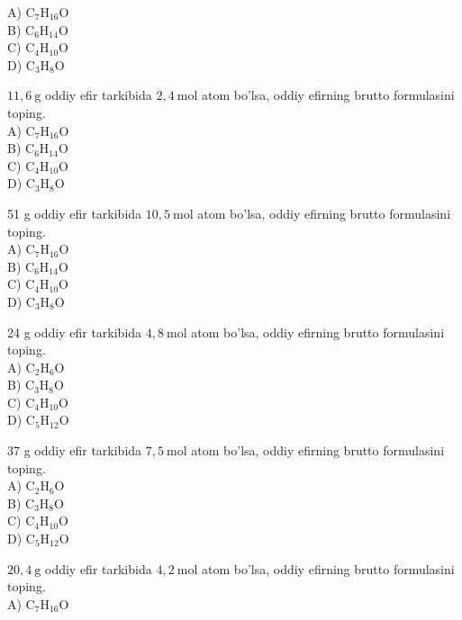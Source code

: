 A) $\mathrm{C}_{7} \mathrm{H}_{16} \mathrm{O}$\\
B) $\mathrm{C}_{6} \mathrm{H}_{14} \mathrm{O}$\\
C) $\mathrm{C}_{4} \mathrm{H}_{10} \mathrm{O}$\\
D) $\mathrm{C}_{3} \mathrm{H}_{8} \mathrm{O}$
  \item $11,6 \mathrm{~g}$ oddiy efir tarkibida $2,4 \mathrm{~mol}$ atom bo'lsa, oddiy efirning brutto formulasini toping.\\
A) $\mathrm{C}_{7} \mathrm{H}_{16} \mathrm{O}$\\
B) $\mathrm{C}_{6} \mathrm{H}_{14} \mathrm{O}$\\
C) $\mathrm{C}_{4} \mathrm{H}_{10} \mathrm{O}$\\
D) $\mathrm{C}_{3} \mathrm{H}_{8} \mathrm{O}$
  \item 51 g oddiy efir tarkibida $10,5 \mathrm{~mol}$ atom bo'lsa, oddiy efirning brutto formulasini toping.\\
A) $\mathrm{C}_{7} \mathrm{H}_{16} \mathrm{O}$\\
B) $\mathrm{C}_{6} \mathrm{H}_{14} \mathrm{O}$\\
C) $\mathrm{C}_{4} \mathrm{H}_{10} \mathrm{O}$\\
D) $\mathrm{C}_{3} \mathrm{H}_{8} \mathrm{O}$
  \item 24 g oddiy efir tarkibida $4,8 \mathrm{~mol}$ atom bo'lsa, oddiy efirning brutto formulasini toping.\\
A) $\mathrm{C}_{2} \mathrm{H}_{6} \mathrm{O}$\\
B) $\mathrm{C}_{3} \mathrm{H}_{8} \mathrm{O}$\\
C) $\mathrm{C}_{4} \mathrm{H}_{10} \mathrm{O}$\\
D) $\mathrm{C}_{5} \mathrm{H}_{12} \mathrm{O}$
  \item 37 g oddiy efir tarkibida $7,5 \mathrm{~mol}$ atom bo'lsa, oddiy efirning brutto formulasini toping.\\
A) $\mathrm{C}_{2} \mathrm{H}_{6} \mathrm{O}$\\
B) $\mathrm{C}_{3} \mathrm{H}_{8} \mathrm{O}$\\
C) $\mathrm{C}_{4} \mathrm{H}_{10} \mathrm{O}$\\
D) $\mathrm{C}_{5} \mathrm{H}_{12} \mathrm{O}$
  \item $20,4 \mathrm{~g}$ oddiy efir tarkibida $4,2 \mathrm{~mol}$ atom bo'lsa, oddiy efirning brutto formulasini toping.\\
A) $\mathrm{C}_{7} \mathrm{H}_{16} \mathrm{O}$\\
